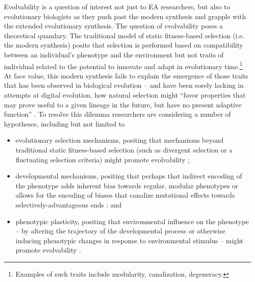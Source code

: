 Evolvability is a question of interest not just to EA researchers, but also to evolutionary biologists as they push past the modern synthesis and grapple with the extended evolutionary synthesis. The question of evolvability poses a theoretical quandary. The traditional model of static fitness-based selection (i.e. the modern synthesis) posits that selection is performed based on compatibility between an individual's phenotype and the environment but not traits of individual related to the potential to innovate and adapt in evolutionary time.\footnote{Examples of such traits include modularity, canalization, degeneracy.} At face value, this modern synthesis fails to explain the emergence of those traits that has been observed in biological evolution -- and have been sorely lacking in attempts at digital evolution, how natural selection might  ``favor properties that may prove useful to a given lineage in the future, but have no present adaptive function'' \cite{Pigliucci2008IsEvolvable}. To resolve this dilemma researchers are considering a number of hypotheses, including but not limited to
\begin{itemize}
\item evolutionary selection mechanisms, positing that mechanisms beyond traditional static fitness-based selection (such as divergent selection or a fluctuating selection criteria) might promote evolvability \cite{Mengistu2016EvolvabilityIt, Kashtan2007VaryingEvolution};
\item developmental mechanisms, positing that perhaps that indirect encoding of the phenotype adds inherent bias towards regular, modular phenotypes \cite{Clune2011OnRegularity} or allows for the encoding of biases that canalize mutational effects towards selectively-advantageous ends \cite{Reisinger2007AcquiringRepresentations}; and
\item phenotypic plasticity, positing that environmental influence on the phenotype -- by altering the trajectory of the developmental process or otherwise inducing phenotypic changes in response to environmental stimulus \cite{Fusco2010PhenotypicConcepts} -- might promote evolvability \cite{Moczek2011TheInnovation}.
\end{itemize}
